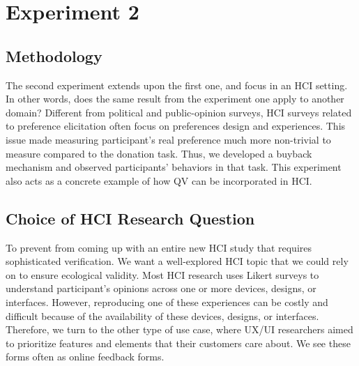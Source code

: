 \section{Experiment 2}
\subsection{Methodology} \label{method-2}
The second experiment extends upon the first one, and focus in an HCI setting.
In other words, does the same result from the experiment one apply to another domain?
Different from political and public-opinion surveys, HCI surveys related to preference elicitation often focus on preferences design and experiences.
This issue made measuring participant's real preference much more non-trivial to measure compared to the donation task.
Thus, we developed a buyback mechanism and observed participants' behaviors in that task.
This experiment also acts as a concrete example of how QV can be incorporated in HCI.

\subsection{Choice of HCI Research Question}
To prevent from coming up with an entire new HCI study that requires sophisticated verification.
We want a well-explored HCI topic that we could rely on to ensure ecological validity.
Most HCI research uses Likert surveys to understand participant's opinions across one or more devices, designs, or interfaces.
However, reproducing one of these experiences can be costly and difficult because of the availability of these devices, designs, or interfaces.
Therefore, we turn to the other type of use case, where UX/UI researchers aimed to prioritize features and elements that their customers care about.
We see these forms often as online feedback forms.


